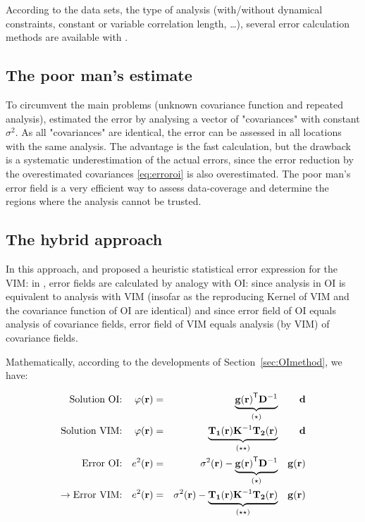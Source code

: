 According to the data sets, the type of analysis (with/without dynamical constraints, constant or variable correlation length, \ldots), several error calculation methods are available with \diva. 

\subsection{The poor man's estimate\label{sec:poormans}}

To circumvent the main problems (unknown covariance function and repeated analysis), \citet{BRASSEUR94} estimated the error by analysing a vector of "covariances" with constant $\sigma^2$. As all "covariances" are identical, the error can be assessed in all locations with the same analysis. The advantage is the fast calculation, but the drawback is a systematic underestimation of the actual errors, since the error reduction by the overestimated covariances \eqref{eq:erroroi} is also overestimated. The poor man's error field is a very efficient way to assess data-coverage and determine the regions where the analysis cannot be trusted.

\subsection{The hybrid approach}

In this approach, \citet{BRANKART98} and \citet{RIXEN00} proposed a heuristic statistical error expression for the VIM: in \diva, error fields are calculated by analogy with OI: since analysis in OI is equivalent to analysis with VIM (insofar as the reproducing Kernel of VIM and the covariance function of OI are identical) and since error field of OI equals analysis of covariance fields, error field of VIM equals analysis (by VIM) of covariance fields.

Mathematically, according to the developments of Section~\ref{sec:OImethod}, we have:

\begin{align}
\textrm{Solution OI:} 	&	& \varphi(\mathbf{r}) &=& \underbrace{\mathbf{g}{(\mathbf{r})}^\mathsf{T}\mathbf{D}^{-1}}_{(\star)}		&& \mathbf{d}\\
\textrm{Solution VIM:}	&	& \varphi(\mathbf{r}) &=& \underbrace{\mathbf{T_{1}}(\mathbf{r})\mathbf{K}^{-1} \mathbf{T_{2}}(\mathbf{r})}_{(\star\star)} 																								&&\mathbf{d}\\
\textrm{Error~OI:}  	& 	& e^{2}(\mathbf{r})   &=& \sigma^{2}(\mathbf{r})-\underbrace{\mathbf{g}{(\mathbf{r})}^\mathsf{T}\mathbf{D}^{-1}}_{(\star)}														&&\mathbf{g}(\mathbf{r})	\\		
\rightarrow \textrm{Error~VIM:}		& 	& e^{2}(\mathbf{r})   &=& \sigma^{2}(\mathbf{r})-\underbrace{\mathbf{T_{1}}(\mathbf{r})\mathbf{K}^{-1} \mathbf{T_{2}}(\mathbf{r})}_{(\star\star)}		&&\mathbf{g}(\mathbf{r})
\end{align}


